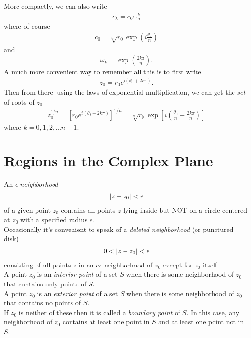 \documentclass{book}
\theoremstyle{definition}
\newcommand{\f}[2]{\frac{#1}{#2}}
\newcommand{\lp}{\left(}
\newcommand{\rp}{\right)}
\newcommand{\lb}{\left[}
\newcommand{\rb}{\right]}
\begin{document}
More compactly, we can also write
\begin{align}
c_k = c_0 \omega_n^k
\end{align}
where of course
\begin{align}
c_0 = \sqrt[n]{r_0}\exp\lp i\f{\theta_0}{n} \rp
\end{align}
and
\begin{align}
\omega_k = \exp\lp \f{2k\pi}{n} \rp.
\end{align}
A much more convenient way to remember all this is to first write 
\begin{align}
z_0 = r_0 e^{i(\theta_0 + 2k\pi)}.
\end{align}
Then from there, using the laws of exponential multiplication, we can get the \textit{set} of roots of $z_0$
\begin{align}
z_0^{1/n} = \lb r_0 e^{i(\theta_0 + 2k\pi)} \rb^{1/n} = \sqrt[n]{r_0}\exp\lb i\lp \f{\theta_0}{n} + \f{2k\pi}{n} \rp\rb
\end{align}
where $k = 0,1,2,\dots n-1$.



\section{Regions in the Complex Plane}

An $\epsilon$ \textit{neighborhood} 
\begin{align}
\abs{z - z_0} < \epsilon
\end{align}
of a given point $z_0$ contains all points $z$ lying inside but NOT on a circle centered at $z_0$ with a specified radius $\epsilon$. \\

Occasionally it's convenient to speak of a \textit{deleted neighborhood} (or punctured disk)
\begin{align}
0 < \abs{z - z_0} < \epsilon
\end{align}
consisting of all points $z$ in an $e\epsilon$ neighborhood of $z_0$ except for $z_0$ itself. \\

A point $z_0$ is an \textit{interior point} of a set $S$ when there is some neighborhood of $z_0$ that contains only points of $S$. \\

A point $z_0$ is an \textit{exterior point} of a set $S$ when there is some neighborhood of $z_0$ that contains no points of $S$. \\

If $z_0$ is neither of these then it is called a \textit{boundary point} of $S$. In this case, any neighborhood of $z_0$ contains at least one point in $S$ and at least one point not in $S$. \\
\end{document}
